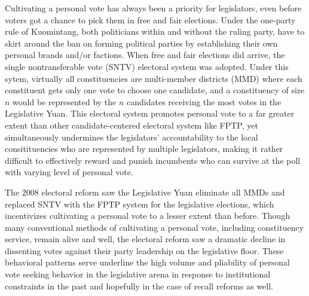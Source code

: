 \documentclass[hyphens, crop=false]{standalone}
\begin{document}
	
		Cultivating a personal vote has always been a priority for legislators,
		even before voters got a chance to pick them in free and fair elections.
		Under the one-party rule of Kuomintang,
		both politicians within and without the ruling party,
		have to skirt around the ban on forming political parties
		by establishing their own personal brands and/or factions.
		When free and fair elections did arrive,
		the single nontransferable vote (SNTV) electoral system was adopted.
		Under this sytem,
		virtually all constituencies are multi-member districts (MMD)
		where each constituent gets only one vote to choose one candidate,
		and a constituency of size $n$
		would be represented by the $n$ candidates receiving the most votes
		in the Legislative Yuan.
		This electoral system promotes personal vote to a far greater extent than
		other candidate-centered electoral system like FPTP,
		yet simultaneously undermines the legislators' accountability to
		the local consitituencies who are represented by multiple legislators,
		making it rather difficult to effectively reward and punish incumbents
		who can survive
		at the poll
		with varying level of personal vote.
		
		The 2008 electoral reform
		saw the Legislative Yuan eliminate all MMDs and replaced SNTV with the FPTP system
		for the legislative elections,
		which incentivizes cultivating a personal vote
		to a lesser extent than before.
		Though many conventional methods of cultivating a personal vote,
		including constituency service,
		remain alive and well,
		the electoral reform saw a dramatic decline in 
		dissenting votes against their party leadership on the legislative floor.
		These behavioral patterns serve underline
		the high volume and pliability of personal vote seeking behavior in the legislative arena
		in response to institutional constraints
		in the past and hopefully in the case of recall reforms as well.
		
	
	
\end{document}
